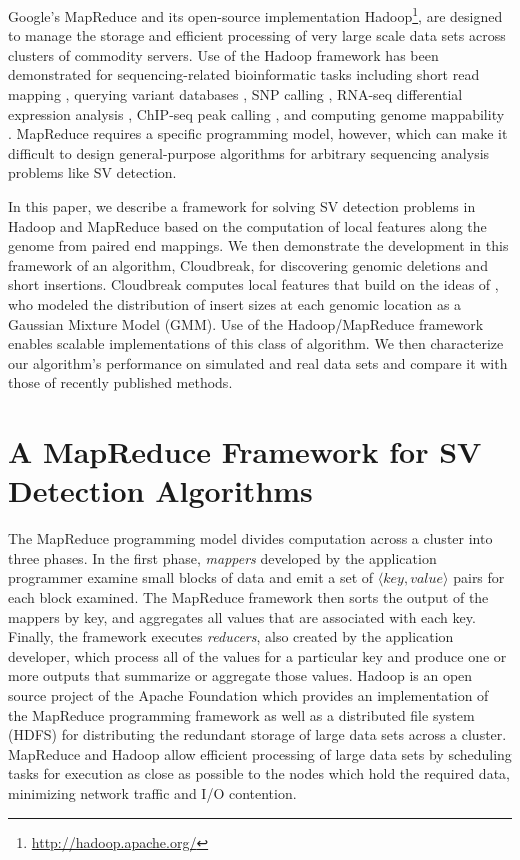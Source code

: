 \documentclass[11pt]{article}
\begin{document}
Google's MapReduce \autocite{Dean:2008p277} and its open-source implementation Hadoop\footnote{\url{http://hadoop.apache.org/}}, are designed to manage the storage and efficient processing of very large scale data sets across clusters of commodity servers. Use of the Hadoop framework has been demonstrated for sequencing-related bioinformatic tasks including short read mapping \autocite{Schatz:2009p278}, querying variant databases \autocite{Oconnor:2010p1835}, SNP calling \autocite{Langmead:2009p1225}, RNA-seq differential expression analysis \autocite{Langmead:2010p1268}, ChIP-seq peak calling \autocite{Feng:2011p1228}, and computing genome mappability \autocite{Lee:2012bk}. MapReduce requires a specific programming model, however, which can make it difficult to design general-purpose algorithms for arbitrary sequencing analysis problems like SV detection.

In this paper, we describe a framework for solving SV detection problems in Hadoop and MapReduce based on the computation of local features along the genome from paired end mappings. We then demonstrate the development in this framework of an algorithm, Cloudbreak, for discovering genomic deletions and short insertions. Cloudbreak computes local features that build on the ideas of \autocite{Lee:2009da}, who modeled the distribution of insert sizes at each genomic location as a Gaussian Mixture Model (GMM). Use of the Hadoop/MapReduce framework enables scalable implementations of this class of algorithm. We then characterize our algorithm's performance on simulated and real data sets and compare it with those of recently published methods.

\section{A MapReduce Framework for SV Detection Algorithms}

The MapReduce programming model \autocite{Dean:2008p277} divides computation across a cluster into three phases. In the first phase, \emph{mappers} developed by the application programmer examine small blocks of data and emit a set of $\langle key, value \rangle$ pairs for each block examined. The MapReduce framework then sorts the output of the mappers by key, and aggregates all values that are associated with each key. Finally, the framework executes \emph{reducers}, also created by the application developer, which process all of the values for a particular key and produce one or more outputs that summarize or aggregate those values. Hadoop is an open source project of the Apache Foundation which provides an implementation of the MapReduce programming framework as well as a distributed file system (HDFS) for distributing the redundant storage of large data sets across a cluster. MapReduce and Hadoop allow efficient processing of large data sets by scheduling tasks for execution as close as possible to the nodes which hold the required data, minimizing network traffic and I/O contention.
\end{document}
